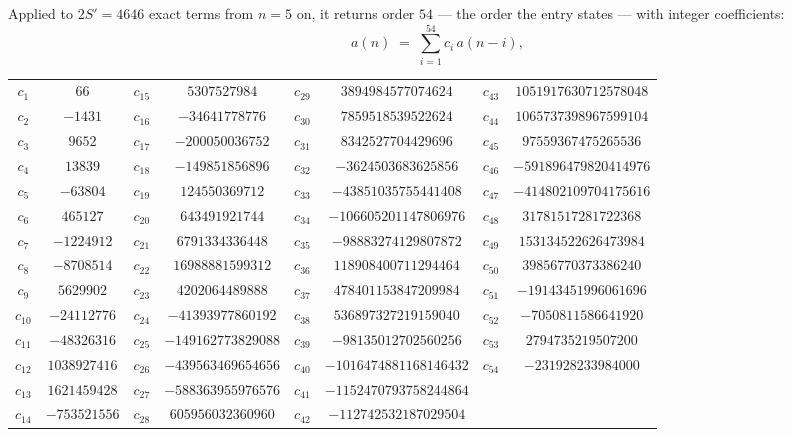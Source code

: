 \documentclass[11pt,a4paper]{article}
\theoremstyle{plain}
\theoremstyle{definition}
\begin{document}
Applied to $2S'=4646$ exact terms from $n=5$ on, it returns order $54$ --- the
order the entry states --- with integer coefficients:
\[
a(n)\;=\;\sum_{i=1}^{54}c_i\,a(n-i),
\]
\begin{center}\small
\begin{tabular}{cccccccc}
$c_{1}$ & $66$ & $c_{15}$ & $5307527984$ & $c_{29}$ & $3894984577074624$ & $c_{43}$ & $1051917630712578048$ \\
$c_{2}$ & $-1431$ & $c_{16}$ & $-34641778776$ & $c_{30}$ & $7859518539522624$ & $c_{44}$ & $1065737398967599104$ \\
$c_{3}$ & $9652$ & $c_{17}$ & $-200050036752$ & $c_{31}$ & $8342527704429696$ & $c_{45}$ & $97559367475265536$ \\
$c_{4}$ & $13839$ & $c_{18}$ & $-149851856896$ & $c_{32}$ & $-3624503683625856$ & $c_{46}$ & $-591896479820414976$ \\
$c_{5}$ & $-63804$ & $c_{19}$ & $124550369712$ & $c_{33}$ & $-43851035755441408$ & $c_{47}$ & $-414802109704175616$ \\
$c_{6}$ & $465127$ & $c_{20}$ & $643491921744$ & $c_{34}$ & $-106605201147806976$ & $c_{48}$ & $31781517281722368$ \\
$c_{7}$ & $-1224912$ & $c_{21}$ & $6791334336448$ & $c_{35}$ & $-98883274129807872$ & $c_{49}$ & $153134522626473984$ \\
$c_{8}$ & $-8708514$ & $c_{22}$ & $16988881599312$ & $c_{36}$ & $118908400711294464$ & $c_{50}$ & $39856770373386240$ \\
$c_{9}$ & $5629902$ & $c_{23}$ & $4202064489888$ & $c_{37}$ & $478401153847209984$ & $c_{51}$ & $-19143451996061696$ \\
$c_{10}$ & $-24112776$ & $c_{24}$ & $-41393977860192$ & $c_{38}$ & $536897327219159040$ & $c_{52}$ & $-7050811586641920$ \\
$c_{11}$ & $-48326316$ & $c_{25}$ & $-149162773829088$ & $c_{39}$ & $-98135012702560256$ & $c_{53}$ & $2794735219507200$ \\
$c_{12}$ & $1038927416$ & $c_{26}$ & $-439563469654656$ & $c_{40}$ & $-1016474881168146432$ & $c_{54}$ & $-231928233984000$ \\
$c_{13}$ & $1621459428$ & $c_{27}$ & $-588363955976576$ & $c_{41}$ & $-1152470793758244864$ &  &  \\
$c_{14}$ & $-753521556$ & $c_{28}$ & $605956032360960$ & $c_{42}$ & $-112742532187029504$ &  &  \\
\end{tabular}
\end{center}
\end{document}
